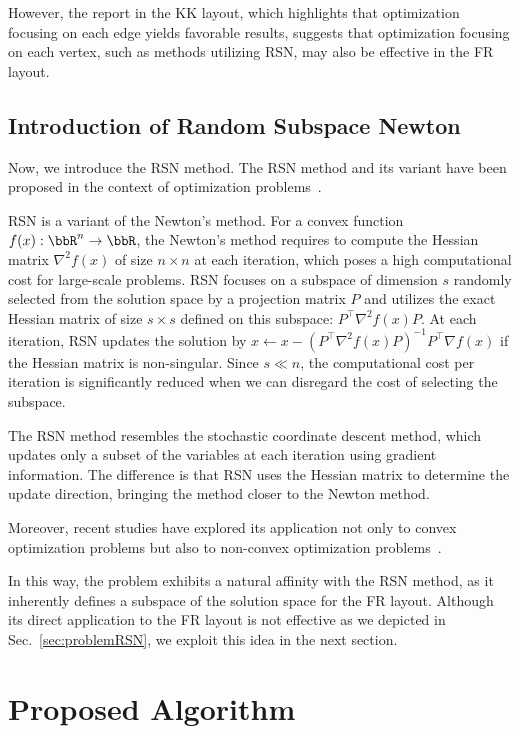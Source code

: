 \documentclass[dvipdfmx,journal]{IEEEtran}
\begin{document}
However, the report in the KK layout, which highlights that optimization focusing on each edge yields favorable results, suggests that optimization focusing on each vertex, such as methods utilizing RSN, may also be effective in the FR layout.

\subsection{Introduction of Random Subspace Newton}\label{ssec:introRSN}

Now, we introduce the RSN method. The RSN method and its variant have been proposed in the context of optimization problems~\cite{NEURIPS2019_bc6dc48b,fujiRandomizedSubspaceRegularized2022,cartisRandomisedSubspaceMethods2022,higuchiFastConvergenceSecondOrder2024}.

RSN is a variant of the Newton's method.
For a convex function $f(x): \bbR^n \to \bbR$, the Newton's method requires to compute the Hessian matrix $\nabla^2 f(x)$ of size $n \times n$ at each iteration, which poses a high computational cost for large-scale problems.
RSN focuses on a subspace of dimension $s$ randomly selected from the solution space by a projection matrix $P$ and utilizes the exact Hessian matrix of size $s \times s$ defined on this subspace: $P^\top \nabla^2 f(x) P$.
At each iteration, RSN updates the solution by $x \gets x - (P^\top \nabla^2 f(x) P)^{-1} P^\top \nabla f(x)$ if the Hessian matrix is non-singular.
Since $s \ll n$, the computational cost per iteration is significantly reduced when we can disregard the cost of selecting the subspace.

The RSN method resembles the stochastic coordinate descent method, which updates only a subset of the variables at each iteration using gradient information.
The difference is that RSN uses the Hessian matrix to determine the update direction, bringing the method closer to the Newton method.

Moreover, recent studies have explored its application not only to convex optimization problems but also to non-convex optimization problems~\cite{fujiRandomizedSubspaceRegularized2022}.

In this way, the problem exhibits a natural affinity with the RSN method, as it inherently defines a subspace of the solution space for the FR layout.
Although its direct application to the FR layout is not effective as we depicted in Sec.~\ref{sec:problemRSN}, we exploit this idea in the next section.

\section{Proposed Algorithm}\label{sec:algorithm}
\end{document}
